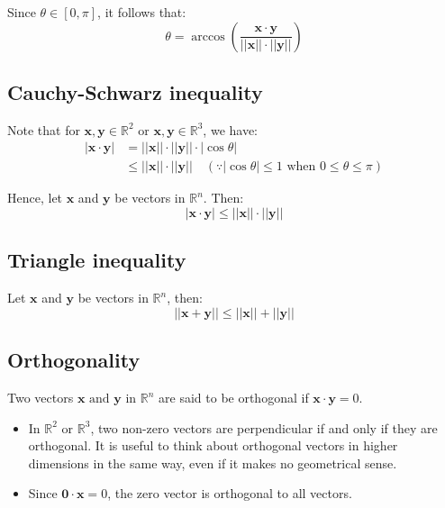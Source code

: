 \documentclass[11pt]{article}
\begin{document}
Since \(\theta \in [0, \pi]\), it follows that:
\[\theta = \arccos \left( \frac{\boldsymbol{x} \cdot \boldsymbol{y}}{|| \boldsymbol{x} || \cdot || \boldsymbol{y} ||} \right)\]

\subsection{Cauchy-Schwarz inequality}
\label{sec:orgfa7b7b4}
Note that for \(\boldsymbol{x}, \boldsymbol{y} \in \mathbb{R}^2\) or \(\boldsymbol{x}, \boldsymbol{y} \in \mathbb{R}^3\), we have:
\begin{align*}
| \boldsymbol{x} \cdot \boldsymbol{y} | &= || \boldsymbol{x} || \cdot || \boldsymbol{y} || \cdot | \cos \theta | \\
&\le || \boldsymbol{x} || \cdot || \boldsymbol{y} || \quad (\because | \cos \theta | \le 1 \text{ when } 0 \le \theta \le \pi)
\end{align*}

Hence, let \(\boldsymbol{x}\) and \(\boldsymbol{y}\) be vectors in \(\mathbb{R}^n\). Then:
\[| \boldsymbol{x} \cdot \boldsymbol{y} | \le || \boldsymbol{x} || \cdot || \boldsymbol{y} ||\]

\subsection{Triangle inequality}
\label{sec:org5b62125}
Let \(\boldsymbol{x}\) and \(\boldsymbol{y}\) be vectors in \(\mathbb{R}^n\), then:
\[|| \boldsymbol{x} + \boldsymbol{y} || \le || \boldsymbol{x} || + || \boldsymbol{y} ||\]

\subsection{Orthogonality}
\label{sec:org96a1b76}
Two vectors \(\boldsymbol{x} \text{ and } \boldsymbol{y}\) in \(\mathbb{R}^n\) are said to be orthogonal if \(\boldsymbol{x} \cdot \boldsymbol{y} = 0\).
\\[0pt]

\begin{itemize}
\item In \(\mathbb{R}^2\) or \(\mathbb{R}^3\), two non-zero vectors are perpendicular if and only if they are orthogonal. It is useful to think about orthogonal vectors in higher dimensions in the same way, even if it makes no geometrical sense.
\item Since \(\boldsymbol{0} \cdot \boldsymbol{x} = 0\), the zero vector is orthogonal to all vectors.
\end{itemize}
\end{document}
